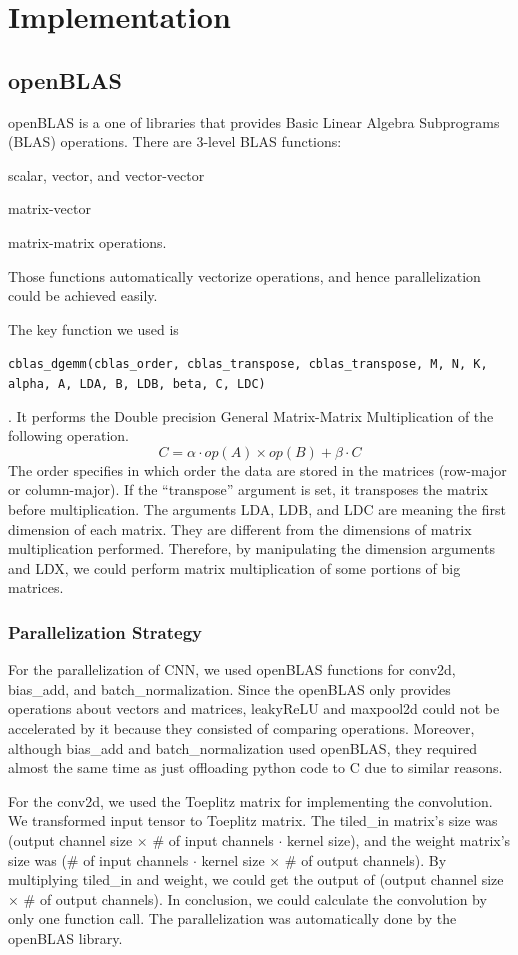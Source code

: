 \documentclass[a4paper,12pt]{article}
\begin{document}
\section{Implementation}

\subsection{openBLAS}
openBLAS is a one of libraries that provides Basic Linear Algebra Subprograms (BLAS) operations. There are 3-level BLAS functions: \begin{enumerate*} \item scalar, vector, and vector-vector \item matrix-vector \item matrix-matrix operations. \end{enumerate*} Those functions automatically vectorize operations, and hence parallelization could be achieved easily.


			The key function we used is {\raggedright{} \lstinline{cblas_dgemm(cblas_order, cblas_transpose, cblas_transpose, M, N, K, alpha, A, LDA, B, LDB, beta, C, LDC)}}. It performs the Double precision General Matrix-Matrix Multiplication of the following operation.
\[
C = \alpha \cdot op(A) \times op(B) + \beta \cdot C
\]
The order specifies in which order the data are stored in the matrices (row-major or column-major). If the ``transpose'' argument is set, it transposes the matrix before multiplication. The arguments LDA, LDB, and LDC are meaning the first dimension of each matrix. They are different from the dimensions of matrix multiplication performed. Therefore, by manipulating the dimension arguments and LDX, we could perform matrix multiplication of some portions of big matrices.

\subsubsection{Parallelization Strategy}

For the parallelization of CNN, we used openBLAS functions for conv2d, bias\_add, and batch\_normalization. Since the openBLAS only provides operations about vectors and matrices, leakyReLU and maxpool2d could not be accelerated by it because they consisted of comparing operations. Moreover, although bias\_add and batch\_normalization used openBLAS, they required almost the same time as just offloading python code to C due to similar reasons.

For the conv2d, we used the Toeplitz matrix for implementing the convolution. We transformed input tensor to Toeplitz matrix. The tiled\_in matrix’s size was (output channel size $\times$ \# of input channels $\cdot$ kernel size), and the weight matrix’s size was (\# of input channels $\cdot$ kernel size $\times$ \# of output channels). By multiplying tiled\_in and weight, we could get the output of (output channel size $\times$ \# of output channels). In conclusion, we could calculate the convolution by only one function call. The parallelization was automatically done by the openBLAS library.
\end{document}
